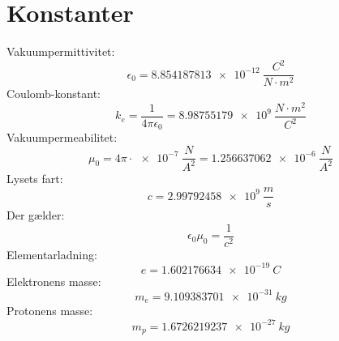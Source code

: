 \documentclass[]{article}
\theoremstyle{definition}
\begin{document}
\section{Konstanter}
Vakuumpermittivitet:
\begin{equation*}
	\epsilon_0 = \SI{8.854187813e-12}{\dfrac{C^2}{N \cdot m^2}}
\end{equation*}
Coulomb-konstant:
\begin{equation*}
	k_e = \frac{1}{4\pi \epsilon_0} = \SI{8.98755179e9}{\dfrac{N \cdot m^2}{C^2}}
\end{equation*}
Vakuumpermeabilitet:
\begin{equation*}
	\mu_0 = 4\pi \cdot \SI{e-7}{\frac{N}{A^2}} = \SI{1.256637062e-6}{\frac{N}{A^2}}
\end{equation*}
Lysets fart:
\begin{equation*}
	c = \SI{2.99 792 458e9}{\frac{m}{s}}
\end{equation*}
Der gælder:
\begin{equation*}
	\epsilon_0 \mu_0 = \dfrac{1}{c^2}
\end{equation*}
Elementarladning:
\begin{equation*}
	e = \SI{1.602176634e-19}{C}
\end{equation*}
Elektronens masse:
\begin{equation*}
	m_e = \SI{9.109383701e-31}{kg}
\end{equation*}
Protonens masse:
\begin{equation*}
	m_p = \SI{1.6726219237e-27}{kg}
\end{equation*}

\end{document}
